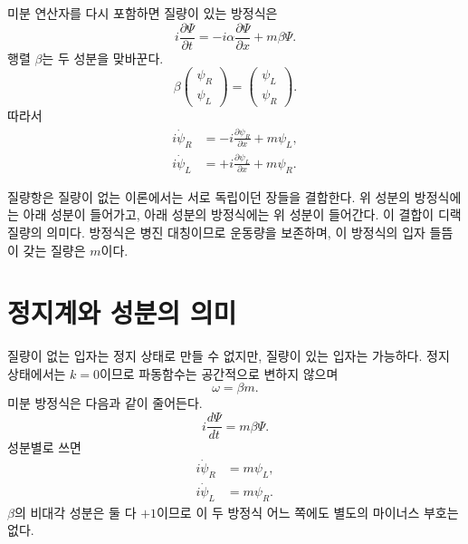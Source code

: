 미분 연산자를 다시 포함하면 질량이 있는 방정식은
\begin{equation}
i\frac{\partial\Psi}{\partial t}
=
-i\alpha\frac{\partial\Psi}{\partial x}
+m\beta\Psi.
\end{equation}
행렬 \(\beta\)는 두 성분을 맞바꾼다.
\begin{equation}
\beta
\begin{pmatrix}
\psi_R\\
\psi_L
\end{pmatrix}
=
\begin{pmatrix}
\psi_L\\
\psi_R
\end{pmatrix}.
\end{equation}
따라서
\begin{align}
i\dot{\psi}_R
&=-i\frac{\partial\psi_R}{\partial x}+m\psi_L,\\
i\dot{\psi}_L
&=+i\frac{\partial\psi_L}{\partial x}+m\psi_R.
\end{align}

질량항은 질량이 없는 이론에서는 서로 독립이던 장들을 결합한다. 위 성분의 방정식에는 아래 성분이 들어가고, 아래 성분의 방정식에는 위 성분이 들어간다. 이 결합이 디랙 질량의 의미다. 방정식은 병진 대칭이므로 운동량을 보존하며, 이 방정식의 입자 들뜸이 갖는 질량은 \(m\)이다.

\begin{classroomqa}
\end{classroomqa}

\section{정지계와 성분의 의미}

질량이 없는 입자는 정지 상태로 만들 수 없지만, 질량이 있는 입자는 가능하다. 정지 상태에서는 \(k=0\)이므로 파동함수는 공간적으로 변하지 않으며
\begin{equation}
\omega=\beta m.
\end{equation}
미분 방정식은 다음과 같이 줄어든다.
\begin{equation}
i\frac{d\Psi}{dt}=m\beta\Psi.
\end{equation}
성분별로 쓰면
\begin{align}
i\dot{\psi}_R&=m\psi_L,\\
i\dot{\psi}_L&=m\psi_R.
\end{align}
\(\beta\)의 비대각 성분은 둘 다 \(+1\)이므로 이 두 방정식 어느 쪽에도 별도의 마이너스 부호는 없다.

